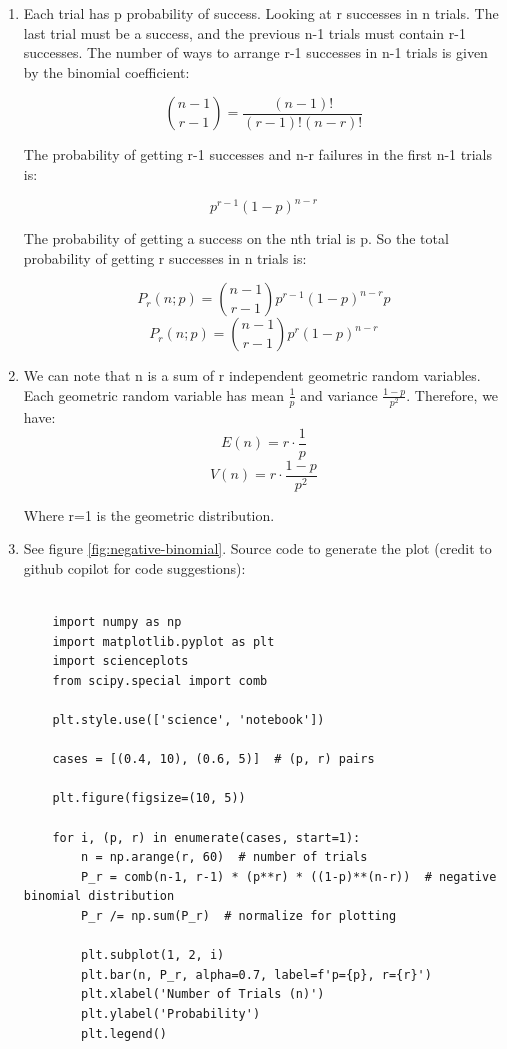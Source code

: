 \documentclass[10pt]{article}
\begin{document}
\begin{enumerate}[label=(\alph*)]
	\item Each trial has p probability of success. Looking at r successes in n trials. The last trial must be a success, and the previous n-1 trials must contain r-1 successes. The number of ways to arrange r-1 successes in n-1 trials is given by the binomial coefficient:

	      \[ {n-1 \choose r-1} = \frac{(n-1)!}{(r-1)!(n-r)!} \]

	      The probability of getting r-1 successes and n-r failures in the first n-1 trials is:

	      \[ p^{r-1} (1-p)^{n-r} \]

	      The probability of getting a success on the nth trial is p. So the total probability of getting r successes in n trials is:

	      \[ P_r(n;p) = {n-1 \choose r-1} p^{r-1} (1-p)^{n-r} p \]
	      \[ \boxed{P_r(n;p)= {n-1 \choose r-1} p^r (1-p)^{n-r}} \]


	\item We can note that n is a sum of r independent geometric random variables. Each geometric random variable has mean \( \frac{1}{p} \) and variance \( \frac{1-p}{p^2} \). Therefore, we have:
	      \[\boxed{E(n) = r \cdot \frac{1}{p} }\]
	      \[\boxed{V(n) = r \cdot \frac{1-p}{p^2} }\]

	      Where r=1 is the geometric distribution.
	\item See figure \ref{fig:negative-binomial}. Source code to generate the plot (credit to github copilot for code suggestions):

	      \begin{verbatim}
	
	import numpy as np
	import matplotlib.pyplot as plt
	import scienceplots
	from scipy.special import comb

	plt.style.use(['science', 'notebook'])

	cases = [(0.4, 10), (0.6, 5)]  # (p, r) pairs

	plt.figure(figsize=(10, 5))

	for i, (p, r) in enumerate(cases, start=1):
		n = np.arange(r, 60)  # number of trials
		P_r = comb(n-1, r-1) * (p**r) * ((1-p)**(n-r))  # negative binomial distribution
		P_r /= np.sum(P_r)  # normalize for plotting

		plt.subplot(1, 2, i)
		plt.bar(n, P_r, alpha=0.7, label=f'p={p}, r={r}')
		plt.xlabel('Number of Trials (n)')
		plt.ylabel('Probability')
		plt.legend()


\end{verbatim}
\end{enumerate}
\end{document}
